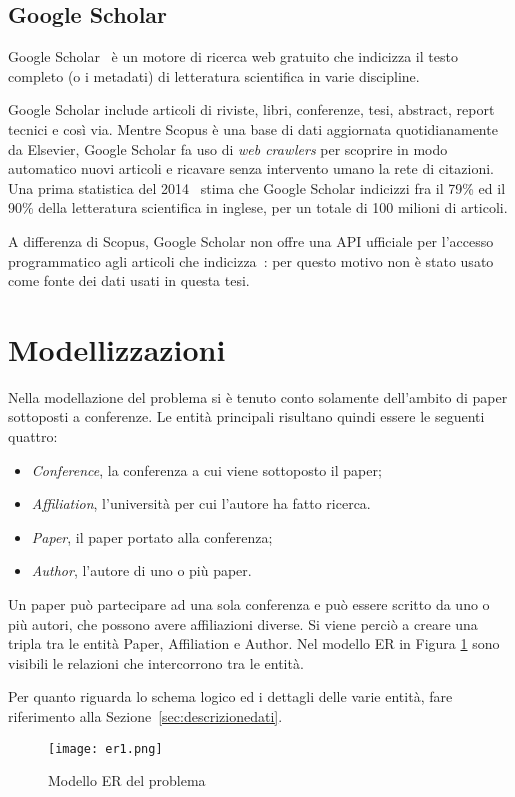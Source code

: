 \subsection{Google Scholar}\label{sec:google-scholar}

Google Scholar~\cite{scholar} è un motore di ricerca web gratuito che indicizza il testo
completo (o i metadati) di letteratura scientifica in varie discipline.

Google Scholar include articoli di riviste, libri, conferenze, tesi, abstract,
report tecnici e così via.
Mentre Scopus è una base di dati aggiornata quotidianamente da Elsevier, Google
Scholar fa uso di \textit{web crawlers} per scoprire in modo automatico nuovi
articoli e ricavare senza intervento umano la rete di citazioni.
Una prima statistica del 2014~\cite{khabsa2014} stima che Google Scholar
indicizzi fra il 79\% ed il 90\% della letteratura scientifica in inglese,
per un totale di 100 milioni di articoli.

A differenza di Scopus, Google Scholar non offre una API ufficiale per l'accesso
programmatico agli articoli che indicizza~\cite{stackoverflowScholarAPI}: per
questo motivo non è stato usato come fonte dei dati usati in questa tesi.




\section{Modellizzazioni}\label{sec:modellizzazioni}

Nella modellazione del problema si è tenuto conto solamente dell'ambito di
paper sottoposti a conferenze. Le entità principali risultano quindi essere
le seguenti quattro:

\begin{itemize}
    \item \textit{Conference}, la conferenza a cui viene sottoposto il paper;
    \item \textit{Affiliation}, l'università per cui l'autore ha fatto ricerca. 
    \item \textit{Paper}, il paper portato alla conferenza;
    \item \textit{Author}, l'autore di uno o più paper. 
\end{itemize}

Un paper può partecipare ad una sola conferenza e può essere scritto da uno o
più autori, che possono avere affiliazioni diverse. Si viene perciò a
creare una tripla tra le entità Paper, Affiliation e Author.
Nel modello ER in Figura \ref{fig:er1} sono visibili le relazioni che
intercorrono tra le entità.

Per quanto riguarda lo schema logico ed i dettagli delle varie entità,
fare riferimento alla Sezione~\ref{sec:descrizionedati}.

\begin{figure}
    \centering
    \texttt{[image: er1.png]}
    \caption{Modello ER del problema}
    \label{fig:er1}
\end{figure}
